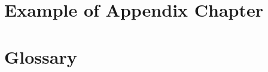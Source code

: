\chapter{Example of Appendix Chapter} \label{appendix:example}

\chapter{Glossary}
\glsaddall
\printglossary
\printglossary[type=\acronymtype]